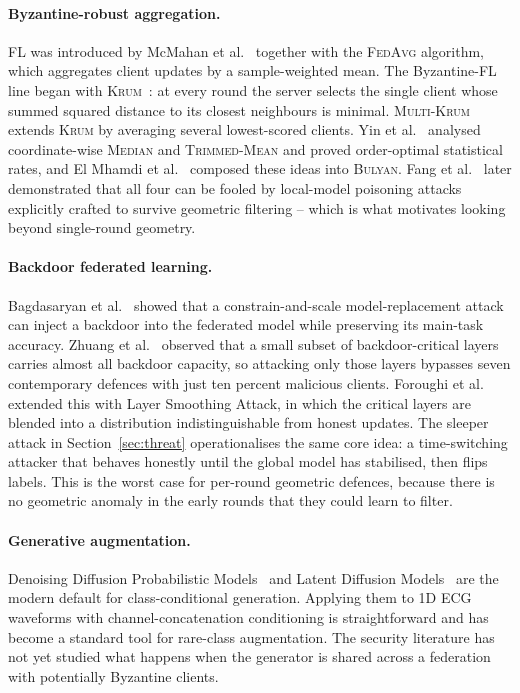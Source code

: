 \documentclass[runningheads]{llncs}
\newcommand{\fedavg}{\textsc{FedAvg}\xspace}
\newcommand{\krum}{\textsc{Krum}\xspace}
\newcommand{\mkrum}{\textsc{Multi-Krum}\xspace}
\newcommand{\median}{\textsc{Median}\xspace}
\newcommand{\tmean}{\textsc{Trimmed-Mean}\xspace}
\newcommand{\bulyan}{\textsc{Bulyan}\xspace}
\begin{document}
\paragraph{Byzantine-robust aggregation.}
FL was introduced by McMahan et al.~\cite{mcmahan2017fedavg} together
with the \fedavg algorithm, which aggregates client updates by a
sample-weighted mean. The Byzantine-FL line began with
\krum~\cite{blanchard2017krum}: at every round the server selects the
single client whose summed squared distance to its closest neighbours
is minimal. \mkrum extends \krum by averaging several lowest-scored
clients. Yin et al.~\cite{yin2018byzantine} analysed coordinate-wise
\median and \tmean and proved order-optimal statistical rates, and
El Mhamdi et al.~\cite{elmhamdi2018bulyan} composed these ideas into
\bulyan. Fang et al.~\cite{fang2020local} later demonstrated that all
four can be fooled by local-model poisoning attacks explicitly
crafted to survive geometric filtering -- which is what motivates
looking beyond single-round geometry.

\paragraph{Backdoor federated learning.}
Bagdasaryan et al.~\cite{bagdasaryan2020how} showed that a
constrain-and-scale model-replacement attack can inject a backdoor
into the federated model while preserving its main-task accuracy.
Zhuang et al.~\cite{zhuang2024bclayers} observed that a small subset
of backdoor-critical layers carries almost all backdoor capacity, so
attacking only those layers bypasses seven contemporary defences with
just ten percent malicious clients. Foroughi et
al.~\cite{foroughi2026lsa} extended this with Layer Smoothing Attack,
in which the critical layers are blended into a distribution
indistinguishable from honest updates. The sleeper attack in
Section~\ref{sec:threat} operationalises the same core idea: a
time-switching attacker that behaves honestly until the global model
has stabilised, then flips labels. This is the worst case for
per-round geometric defences, because there is no geometric anomaly
in the early rounds that they could learn to filter.

\paragraph{Generative augmentation.}
Denoising Diffusion Probabilistic Models~\cite{ho2020ddpm} and Latent
Diffusion Models~\cite{rombach2022ldm} are the modern default for
class-conditional generation. Applying them to 1D ECG waveforms with
channel-concatenation conditioning is straightforward and has become
a standard tool for rare-class augmentation. The security literature
has not yet studied what happens when the generator is shared across
a federation with potentially Byzantine clients.
\end{document}
